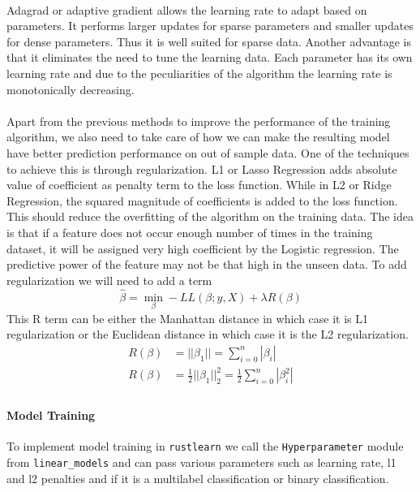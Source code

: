 \documentclass{book}
\begin{document}
\paragraph{}%
Adagrad or adaptive gradient allows the learning rate to adapt based on parameters. It performs larger updates for sparse parameters and smaller updates for dense parameters. Thus it is well suited for sparse data. Another advantage is that it eliminates the need to tune the learning data. Each parameter has its own learning rate and due to the peculiarities of the algorithm the learning rate is monotonically decreasing\cite{WEBSITE:2}.
\label{par:}
\paragraph{}%
Apart from the previous methods to improve the performance of the training algorithm, we also need to take care of how we can make the resulting model have better prediction performance on out of sample data. One of the techniques to achieve this is through regularization. L1 or Lasso Regression adds absolute value of coefficient as penalty term to the loss function. While in L2 or Ridge Regression, the squared magnitude of coefficients is added to the loss function. This should reduce the overfitting of the algorithm on the training data. The idea is that if a feature does not occur enough number of times in the training dataset, it will be assigned very high coefficient by the Logistic regression. The predictive power of the feature may not be that high in the unseen data. To add regularization we will need to add a term
\begin{equation}
	\hat{\beta} = \min_{\beta} - LL(\beta; y, X) + \lambda R(\beta)
\end{equation}
This R term can be either the Manhattan distance in which case it is L1 regularization or the Euclidean distance in which case it is the L2 regularization\cite{WEBSITE:3}.
\begin{align}
	R(\beta) & = || \beta_1 || = \sum_{i=0}^{n}|\beta_i| \\
	R(\beta) &= \frac{1}{2}|| \beta_1 ||_2^2 = \frac{1}{2}\sum_{i=0}^{n}|\beta_i^2| \\
\end{align}
\label{par:}

\paragraph{Model Training}%
To implement model training in \lstinline{rustlearn} we call the \lstinline{Hyperparameter} module from \lstinline{linear_models} and can pass various parameters such as learning rate, l1 and l2 penalties and if it is a multilabel classification or binary classification.
\end{document}
